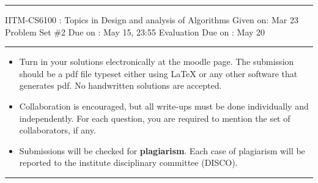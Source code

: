 \documentclass[solution,12pt]{exam}
\begin{document}
\hrule
\vspace{3mm}
\noindent 
{\sf IITM-CS6100 : Topics in Design and analysis of Algorithms  \hfill Given on: Mar 23}
\vspace{3mm}\\
\noindent 
{\sf Problem Set \#2 \hfill Due on : May 15, 23:55}
{\hfill \sf Evaluation Due on : May 20 }
\vspace{3mm}
\hrule
{\small
\begin{itemize}
\item Turn in your solutions electronically at the moodle page. The submission should be a pdf file typeset either using     LaTeX or any other software that generates pdf. No handwritten solutions are accepted. 
\item Collaboration is encouraged, but all write-ups must be done
  individually and independently. For each question, you are required to mention the set of collaborators, if any.  
 \item Submissions will be checked for {\bf plagiarism}. Each case of plagiarism will be reported to the institute disciplinary committee (DISCO). 
\end{itemize}}
\hrule
\vspace{3mm}
\end{document}
